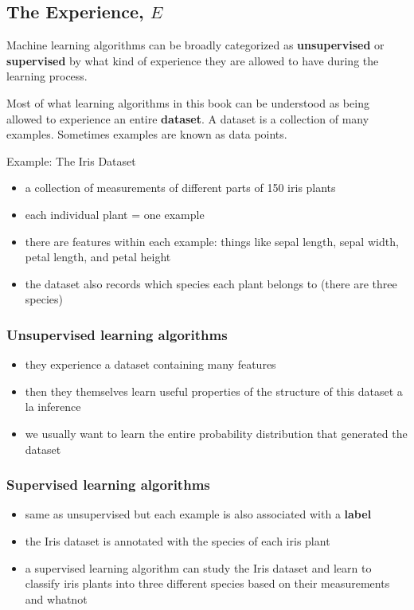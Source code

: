 \documentclass[11pt, twocolumn]{report}
\begin{document}
\subsection{The Experience, $E$}
Machine learning algorithms can be broadly categorized as \textbf{unsupervised}
or \textbf{supervised} by what kind of experience they are allowed to have
during the learning process.

Most of what learning algorithms in this book can be understood as being
allowed to experience an entire \textbf{dataset}. A dataset is a collection of
many examples. Sometimes examples are known as data points.

Example: The Iris Dataset
\begin{itemize}
  \item a collection of measurements of different parts of 150 iris plants
  \item each individual plant = one example
  \item there are features within each example: things like sepal length, sepal
    width, petal length, and petal height
  \item the dataset also records which species each plant belongs to (there are
    three species)
\end{itemize}

\subsubsection{Unsupervised learning algorithms}
\begin{itemize}
  \item they experience a dataset containing many features
  \item then they themselves learn useful properties of the structure of this
    dataset a la inference
  \item we usually want to learn the entire probability distribution that
    generated the dataset
\end{itemize}

\subsubsection{Supervised learning algorithms}
\begin{itemize}
  \item same as unsupervised but each example is also associated with a
    \textbf{label}
  \item the Iris dataset is annotated with the species of each iris plant
  \item a supervised learning algorithm can study the Iris dataset and learn to
    classify iris plants into three different species based on their
    measurements and whatnot
\end{itemize}
\end{document}
